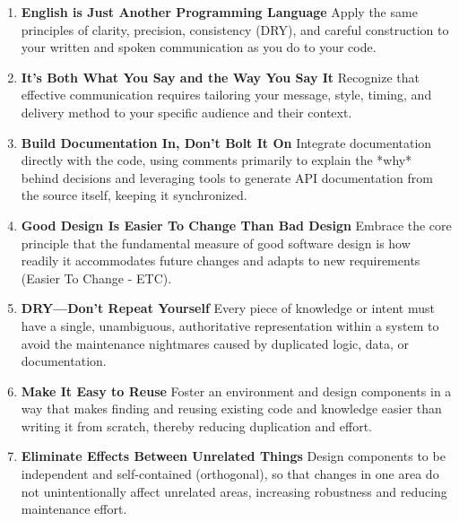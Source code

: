 \documentclass[11pt]{article}
\begin{document}
\begin{tcolorbox}[pragchapterbox={Chapter 2: A Pragmatic Approach}]
\begin{multicols}{2}
\begin{enumerate}[label=\arabic*., start=11, itemsep=1ex, topsep=0pt, partopsep=0pt, labelwidth=!, labelindent=0pt, leftmargin=*]
    \item \textbf{English is Just Another Programming Language}
    Apply the same principles of clarity, precision, consistency (DRY), and careful construction to your written and spoken communication as you do to your code.

    \item \textbf{It's Both What You Say and the Way You Say It}
    Recognize that effective communication requires tailoring your message, style, timing, and delivery method to your specific audience and their context.

    \item \textbf{Build Documentation In, Don't Bolt It On}
    Integrate documentation directly with the code, using comments primarily to explain the *why* behind decisions and leveraging tools to generate API documentation from the source itself, keeping it synchronized.

    \item \textbf{Good Design Is Easier To Change Than Bad Design}
    Embrace the core principle that the fundamental measure of good software design is how readily it accommodates future changes and adapts to new requirements (Easier To Change - ETC).

    \item \textbf{DRY—Don’t Repeat Yourself}
    Every piece of knowledge or intent must have a single, unambiguous, authoritative representation within a system to avoid the maintenance nightmares caused by duplicated logic, data, or documentation.

    \item \textbf{Make It Easy to Reuse}
    Foster an environment and design components in a way that makes finding and reusing existing code and knowledge easier than writing it from scratch, thereby reducing duplication and effort.

    \item \textbf{Eliminate Effects Between Unrelated Things}
    Design components to be independent and self-contained (orthogonal), so that changes in one area do not unintentionally affect unrelated areas, increasing robustness and reducing maintenance effort.


\end{enumerate}
\end{multicols}
\end{tcolorbox}
\end{document}
